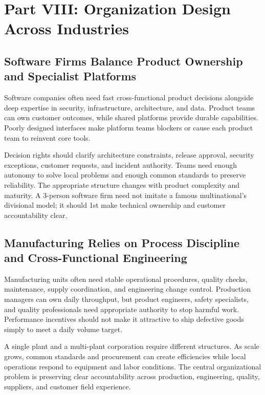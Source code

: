 \section*{Part VIII: Organization Design Across Industries}

\subsection{Software Firms Balance Product Ownership and Specialist Platforms}
\label{sec:software_firms_balance}

Software companies often need fast cross-functional product decisions alongside deep expertise in security, infrastructure, architecture, and data. Product teams can own customer outcomes, while shared platforms provide durable capabilities. Poorly designed interfaces make platform teams blockers or cause each product team to reinvent core tools.

Decision rights should clarify architecture constraints, release approval, security exceptions, customer requests, and incident authority. Teams need enough autonomy to solve local problems and enough common standards to preserve reliability. The appropriate structure changes with product complexity and maturity. A 3-person software firm need not imitate a famous multinational's divisional model; it should 1st make technical ownership and customer accountability clear.

\subsection{Manufacturing Relies on Process Discipline and Cross-Functional Engineering}
\label{sec:manufacturing_discipline_engineering}

Manufacturing units often need stable operational procedures, quality checks, maintenance, supply coordination, and engineering change control. Production managers can own daily throughput, but product engineers, safety specialists, and quality professionals need appropriate authority to stop harmful work. Performance incentives should not make it attractive to ship defective goods simply to meet a daily volume target.

A single plant and a multi-plant corporation require different structures. As scale grows, common standards and procurement can create efficiencies while local operations respond to equipment and labor conditions. The central organizational problem is preserving clear accountability across production, engineering, quality, suppliers, and customer field experience.

